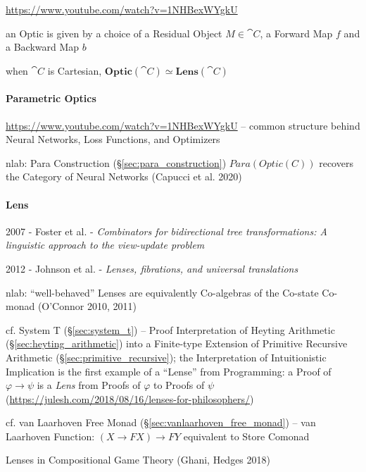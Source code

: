 \asterism

\url{https://www.youtube.com/watch?v=1NHBexWYgkU}

an Optic is given by a choice of a Residual Object $M \in \cat{C}$, a Forward
Map $f$ and a Backward Map $b$

when $\cat{C}$ is Cartesian,
$\mathbf{Optic}(\cat{C}) \simeq \mathbf{Lens}(\cat{C})$



\paragraph{Parametric Optics}\label{sec:parametric_optics}\hfill

\url{https://www.youtube.com/watch?v=1NHBexWYgkU} -- common structure behind
Neural Networks, Loss Functions, and Optimizers

nlab: Para Construction (\S\ref{sec:para_construction}) $Para(Optic(C))$
recovers the Category of Neural Networks (Capucci et al. 2020)



\paragraph{Lens}\label{sec:lens}\hfill

2007 - Foster et al. - \emph{Combinators for bidirectional tree transformations:
A linguistic approach to the view-update problem}

2012 - Johnson et al. - \emph{Lenses, fibrations, and universal translations}

nlab: ``well-behaved'' Lenses are equivalently Co-algebras of the Co-state
Co-monad (O'Connor 2010, 2011)

\fist cf. System T (\S\ref{sec:system_t}) -- Proof Interpretation of Heyting
Arithmetic (\S\ref{sec:heyting_arithmetic}) into a Finite-type Extension of
Primitive Recursive Arithmetic (\S\ref{sec:primitive_recursive}); the
Interpretation of Intuitionistic Implication is the first example of a ``Lense''
from Programming: a Proof of $\varphi \rightarrow \psi$ is a \emph{Lens} from
Proofs of $\varphi$ to Proofs of $\psi$
(\url{https://julesh.com/2018/08/16/lenses-for-philosophers/})

\fist cf. van Laarhoven Free Monad (\S\ref{sec:vanlaarhoven_free_monad}) -- van
Laarhoven Function: $(X \rightarrow F X) \rightarrow F Y$ equivalent to Store
Comonad

Lenses in Compositional Game Theory (Ghani, Hedges 2018)

